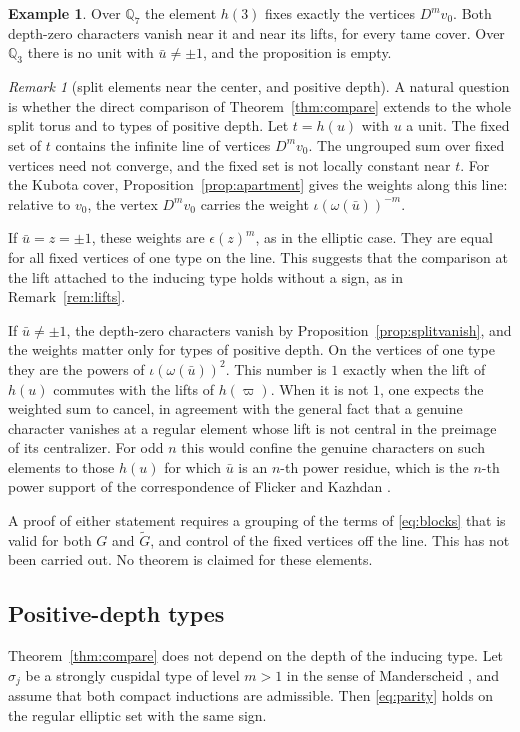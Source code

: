 \documentclass[12pt,letterpaper]{article}
\numberwithin{equation}{section}
\theoremstyle{definition}
\newtheorem{example}[theorem]{Example}
\theoremstyle{remark}
\newtheorem{remarkyr}{Remark}
\newcommand{\Gt}{\widetilde G}
\newcommand{\sgn}{\epsilon}
\begin{document}
\begin{example}
Over $\mathbb Q_7$ the element $h(3)$ fixes exactly the vertices $D^mv_0$. Both depth-zero characters vanish near it and near its lifts, for every tame cover. Over $\mathbb Q_3$ there is no unit with $\bar u\ne\pm1$, and the proposition is empty.
\end{example}

\begin{remarkyr}[split elements near the center, and positive depth]\label{rem:split}
A natural question is whether the direct comparison of Theorem~\ref{thm:compare} extends to the whole split torus and to types of positive depth. Let $t=h(u)$ with $u$ a unit. The fixed set of $t$ contains the infinite line of vertices $D^mv_0$. The ungrouped sum over fixed vertices need not converge, and the fixed set is not locally constant near $t$. For the Kubota cover, Proposition~\ref{prop:apartment} gives the weights along this line: relative to $v_0$, the vertex $D^mv_0$ carries the weight $\iota(\omega(\bar u))^{-m}$.

If $\bar u=z=\pm1$, these weights are $\sgn(z)^m$, as in the elliptic case. They are equal for all fixed vertices of one type on the line. This suggests that the comparison at the lift attached to the inducing type holds without a sign, as in Remark~\ref{rem:lifts}.

If $\bar u\ne\pm1$, the depth-zero characters vanish by Proposition~\ref{prop:splitvanish}, and the weights matter only for types of positive depth. On the vertices of one type they are the powers of $\iota(\omega(\bar u))^2$. This number is $1$ exactly when the lift of $h(u)$ commutes with the lifts of $h(\varpi)$. When it is not $1$, one expects the weighted sum to cancel, in agreement with the general fact that a genuine character vanishes at a regular element whose lift is not central in the preimage of its centralizer. For odd $n$ this would confine the genuine characters on such elements to those $h(u)$ for which $\bar u$ is an $n$-th power residue, which is the $n$-th power support of the correspondence of Flicker and Kazhdan \cite{FK86}.

A proof of either statement requires a grouping of the terms of \eqref{eq:blocks} that is valid for both $G$ and $\Gt$, and control of the fixed vertices off the line. This has not been carried out. No theorem is claimed for these elements.
\end{remarkyr}

\subsection*{Positive-depth types}
Theorem~\ref{thm:compare} does not depend on the depth of the inducing type. Let $\sigma_j$ be a strongly cuspidal type of level $m>1$ in the sense of Manderscheid \cite{Ma84a,Ma84b}, and assume that both compact inductions are admissible. Then \eqref{eq:parity} holds on the regular elliptic set with the same sign.
\end{document}
